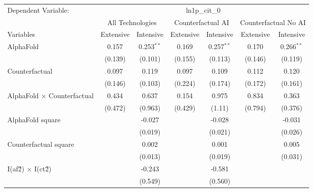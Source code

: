 \begingroup
\centering
\begin{tabular}{lcccccc}
   \tabularnewline \midrule \midrule
   Dependent Variable: & \multicolumn{6}{c}{ln1p\_cit\_0}\\
 & \multicolumn{2}{c}{All Technologies} & \multicolumn{2}{c}{Counterfactual AI} & \multicolumn{2}{c}{Counterfactual No AI} \\
\cmidrule(lr){1-1}\cmidrule(lr){2-3} \cmidrule(lr){4-5} \cmidrule(lr){6-7}
Variables & \multicolumn{1}{c}{Extensive} & \multicolumn{1}{c}{Intensive} & \multicolumn{1}{c}{Extensive} & \multicolumn{1}{c}{Intensive} & \multicolumn{1}{c}{Extensive} & \multicolumn{1}{c}{Intensive} \\
\cmidrule(lr){1-1}\cmidrule(lr){2-2} \cmidrule(lr){3-3} \cmidrule(lr){4-4} \cmidrule(lr){5-5} \cmidrule(lr){6-6} \cmidrule(lr){7-7}
   AlphaFold                          & 0.157   & 0.253$^{**}$ & 0.169   & 0.257$^{**}$ & 0.170   & 0.266$^{**}$\\   
                                      & (0.139) & (0.101)      & (0.155) & (0.113)      & (0.146) & (0.119)\\   
   Counterfactual                     & 0.097   & 0.119        & 0.097   & 0.109        & 0.112   & 0.120\\   
                                      & (0.146) & (0.103)      & (0.224) & (0.174)      & (0.172) & (0.161)\\   
   AlphaFold $\times$ Counterfactual  & 0.434   & 0.637        & 0.154   & 0.975        & 0.834   & 0.363\\   
                                      & (0.472) & (0.963)      & (0.429) & (1.11)       & (0.794) & (0.376)\\   
   AlphaFold square                   &         & -0.027       &         & -0.028       &         & -0.031\\   
                                      &         & (0.019)      &         & (0.021)      &         & (0.026)\\   
   Counterfactual square              &         & 0.002        &         & 0.001        &         & 0.005\\   
                                      &         & (0.013)      &         & (0.019)      &         & (0.031)\\   
   I(af\^2) $\times$ I(ct\^2)         &         & -0.243       &         & -0.581       &         &   \\   
                                      &         & (0.549)      &         & (0.560)      &         &   \\   

\end{tabular}
